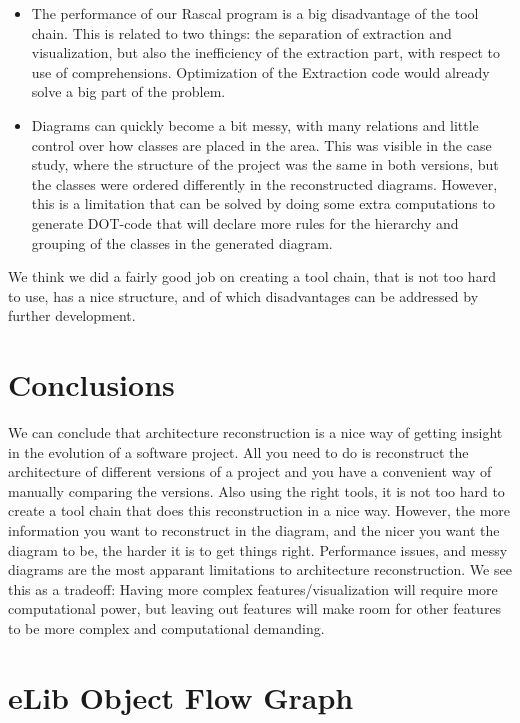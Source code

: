 \documentclass[a4paper,11pt]{article}
\begin{document}
		\begin{itemize}
			\item The performance of our Rascal program is a big disadvantage of the tool chain. This is related to two things: the separation of extraction and visualization, but also the inefficiency of the extraction part, with respect to use of comprehensions. Optimization of the Extraction code would already solve a big part of the problem.
			\item Diagrams can quickly become a bit messy, with many relations and little control over how classes are placed in the area. This was visible in the case study, where the structure of the project was the same in both versions, but the classes were ordered differently in the reconstructed diagrams. However, this is a limitation that can be solved by doing some extra computations to generate DOT-code that will declare more rules for the hierarchy and grouping of the classes in the generated diagram.
		\end{itemize}

		We think we did a fairly good job on creating a tool chain, that is not too hard to use, has a nice structure, and of which disadvantages can be addressed by further development.
	
	\section{Conclusions}
		We can conclude that architecture reconstruction is a nice way of getting insight in the evolution of a software project. All you need to do is reconstruct the architecture of different versions of a project and you have a convenient way of manually comparing the versions. Also using the right tools, it is not too hard to create a tool chain that does this reconstruction in a nice way. However, the more information you want to reconstruct in the diagram, and the nicer you want the diagram to be, the harder it is to get things right. Performance issues, and messy diagrams are the most apparant limitations to architecture reconstruction. We see this as a tradeoff: Having more complex features/visualization will require more computational power, but leaving out features will make room for other features to be more complex and computational demanding.

	\appendix
	\section{eLib Object Flow Graph}
	
\end{document}
